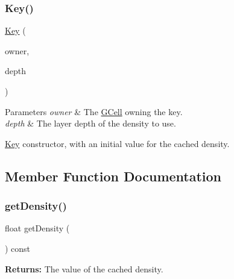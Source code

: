 \subsubsection{\texorpdfstring{Key()}{Key()}}
{\footnotesize\ttfamily \mbox{\hyperlink{classKatabatic_1_1GCell_1_1Key}{Key}} (\begin{DoxyParamCaption}\item[{\mbox{\hyperlink{classKatabatic_1_1GCell}{G\+Cell}} $\ast$}]{owner,  }\item[{unsigned int}]{depth }\end{DoxyParamCaption})\hspace{0.3cm}{\ttfamily [inline]}}


\begin{DoxyParams}{Parameters}
{\em owner} & The \mbox{\hyperlink{classKatabatic_1_1GCell}{G\+Cell}} owning the key. \\
\hline
{\em depth} & The layer {\ttfamily depth} of the density to use.\\
\hline
\end{DoxyParams}
\mbox{\hyperlink{classKatabatic_1_1GCell_1_1Key}{Key}} constructor, with an initial value for the cached density. 

\subsection{Member Function Documentation}
\mbox{\label{classKatabatic_1_1GCell_1_1Key_a9f45c741b4c738e833fe66fe125592b7}} 
\subsubsection{\texorpdfstring{get\+Density()}{getDensity()}}
{\footnotesize\ttfamily float get\+Density (\begin{DoxyParamCaption}{ }\end{DoxyParamCaption}) const\hspace{0.3cm}{\ttfamily [inline]}}

{\bfseries Returns\+:} The value of the cached density. \mbox{\label{classKatabatic_1_1GCell_1_1Key_a819cf639562a031a1e2e061fe1293d66}} 
